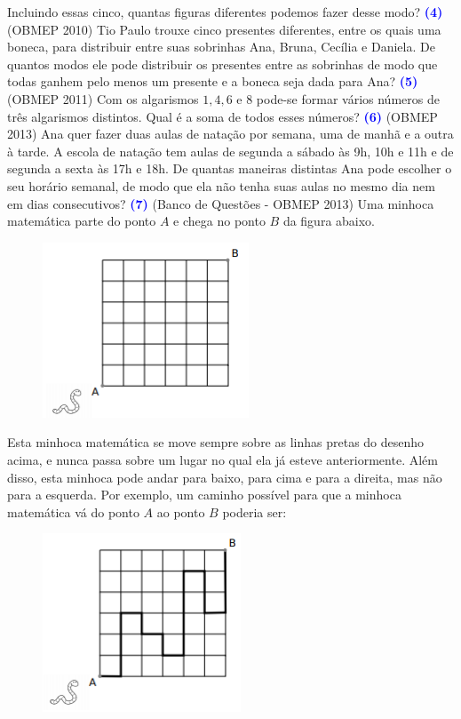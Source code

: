 \documentclass[12pt, a4paper]{article}
\begin{document}
Incluindo essas cinco, quantas figuras diferentes podemos fazer desse modo?
\newline\newline
\textcolor{blue}{\bf(4)} (OBMEP 2010) Tio Paulo trouxe cinco presentes diferentes, entre os quais uma boneca, para distribuir
entre suas sobrinhas Ana, Bruna, Cecília e Daniela. De quantos modos ele pode distribuir os presentes entre as sobrinhas de modo que todas ganhem pelo menos um presente e a boneca seja dada para Ana?
\newline\newline
\textcolor{blue}{\bf(5)} (OBMEP 2011) Com os algarismos $1, 4, 6$ e $8$ pode-se formar vários números de três algarismos distintos. Qual é a soma de todos esses números?
\newline\newline
\textcolor{blue}{\bf(6)} (OBMEP 2013) Ana quer fazer duas aulas de natação por semana, uma de manhã e a outra à tarde. A escola de natação tem aulas de segunda a sábado às 9h, 10h e 11h e de segunda a sexta às 17h e 18h. De quantas maneiras distintas Ana pode escolher o seu horário semanal, de modo que ela não tenha suas aulas no mesmo dia nem em dias consecutivos?
\newline\newline
\textcolor{blue}{\bf(7)} (Banco de Questões - OBMEP 2013) Uma minhoca matemática parte do ponto $A$ e chega no ponto $B$ da figura abaixo.

\begin{figure}
    \centering
    \includegraphics{Figuras/q71c2e1.png}
\end{figure}


Esta minhoca matemática se move sempre sobre as linhas pretas do desenho acima, e nunca passa sobre um lugar no qual ela já esteve anteriormente. Além disso, esta minhoca pode andar para baixo, para cima e para a direita, mas não para a esquerda. Por exemplo, um caminho possível para que a minhoca matemática vá do ponto $A$ ao
ponto $B$ poderia ser:
\begin{figure}[!h]
    \centering
    \includegraphics{Figuras/q72c2e1.png}
\end{figure}
\end{document}
